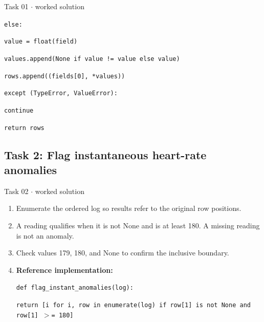 \documentclass[11pt]{article}
\begin{document}
\begin{keepsection}
\begin{workedbox}{Task 01 \ensuremath{\cdot} worked solution}
\begin{enumerate}
\begin{tcolorbox}[colback=Paperblue,colframe=Paperblue,boxrule=0pt,arc=0pt,left=7pt,right=7pt,top=5pt,bottom=5pt]
\noindent\hspace*{7em}\texttt{else:}\par
\noindent\hspace*{9em}\texttt{value = float(field)}\par
\noindent\hspace*{9em}\texttt{values.append(None if value != value else value)}\par
\noindent\hspace*{5em}\texttt{rows.append((fields[0], *values))}\par
\noindent\hspace*{3em}\texttt{except (TypeError, ValueError):}\par
\noindent\hspace*{5em}\texttt{continue}\par
\noindent\hspace*{1em}\texttt{return rows}\par
\end{tcolorbox}
\end{enumerate}
\end{workedbox}

\end{keepsection}
\begin{keepsection}\subsection{Task 2: Flag instantaneous heart-rate anomalies}

\begin{workedbox}{Task 02 \ensuremath{\cdot} worked solution}
\begin{enumerate}
\item Enumerate the ordered log so results refer to the original row positions.
\item A reading qualifies when it is not None and is at least 180. A missing reading is not an anomaly.
\item Check values 179, 180, and None to confirm the inclusive boundary.
\item {}
\textbf{Reference implementation:}
\begin{tcolorbox}[colback=Paperblue,colframe=Paperblue,boxrule=0pt,arc=0pt,left=7pt,right=7pt,top=5pt,bottom=5pt]\small\sloppy
\noindent\hspace*{0em}\texttt{def flag\_instant\_anomalies(log):}\par
\noindent\hspace*{1em}\texttt{return [i for i, row in enumerate(log) if row[1] is not None and row[1] \ensuremath{>}= 180]}\par
\end{tcolorbox}
\end{enumerate}
\end{workedbox}

\end{keepsection}
\end{document}
